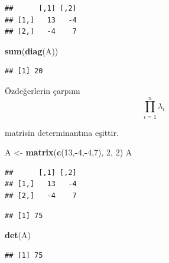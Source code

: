 \documentclass[
]{book}
\newenvironment{Shaded}{\begin{snugshade}}{\end{snugshade}}
\newcommand{\DecValTok}[1]{\textcolor[rgb]{0.00,0.00,0.81}{#1}}
\newcommand{\FunctionTok}[1]{\textcolor[rgb]{0.13,0.29,0.53}{\textbf{#1}}}
\newcommand{\NormalTok}[1]{#1}
\newcommand{\OtherTok}[1]{\textcolor[rgb]{0.56,0.35,0.01}{#1}}
\newcommand{\SpecialCharTok}[1]{\textcolor[rgb]{0.81,0.36,0.00}{\textbf{#1}}}
\begin{document}
\begin{verbatim}
##      [,1] [,2]
## [1,]   13   -4
## [2,]   -4    7
\end{verbatim}

\begin{Shaded}
\begin{Highlighting}[]
 \FunctionTok{sum}\NormalTok{(}\FunctionTok{diag}\NormalTok{(A))}
\end{Highlighting}
\end{Shaded}

\begin{verbatim}
## [1] 20
\end{verbatim}

Özdeğerlerin çarpımı
\[\prod_{i=1}^{n}\lambda_i\]

matrisin determinantına eşittir.

\begin{Shaded}
\begin{Highlighting}[]
\NormalTok{ A }\OtherTok{\textless{}{-}} \FunctionTok{matrix}\NormalTok{(}\FunctionTok{c}\NormalTok{(}\DecValTok{13}\NormalTok{,}\SpecialCharTok{{-}}\DecValTok{4}\NormalTok{,}\SpecialCharTok{{-}}\DecValTok{4}\NormalTok{,}\DecValTok{7}\NormalTok{), }\DecValTok{2}\NormalTok{, }\DecValTok{2}\NormalTok{) }
\NormalTok{ A }
\end{Highlighting}
\end{Shaded}

\begin{verbatim}
##      [,1] [,2]
## [1,]   13   -4
## [2,]   -4    7
\end{verbatim}

\begin{Shaded}
\end{Shaded}

\begin{verbatim}
## [1] 75
\end{verbatim}

\begin{Shaded}
\begin{Highlighting}[]
 \FunctionTok{det}\NormalTok{(A)}
\end{Highlighting}
\end{Shaded}

\begin{verbatim}
## [1] 75
\end{verbatim}
\end{document}
